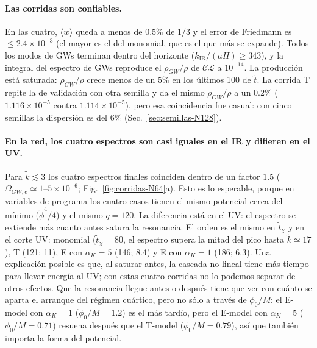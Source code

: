 \documentclass[11pt]{article}
\newcommand{\CosmoLattice}{\ensuremath{\mathcal{C}}\text{osmo}\ensuremath{\mathcal{L}}\text{attice}\xspace}
\begin{document}
            \paragraph{Las corridas son confiables.} En las cuatro, $\langle w\rangle$ queda a menos de $0.5\%$ de $1/3$ y el error de Friedmann es $\le 2.4 \times 10^{-3}$ (el mayor es el del monomial, que es el que más se expande). Todos los modos de GWs terminan dentro del horizonte ($k_{\text{IR}}/(aH) \ge 343$), y la integral del espectro de GWs reproduce el $\rho_{GW}/\rho$ de \CosmoLattice a $10^{-14}$. La producción está saturada: $\rho_{GW}/\rho$ crece menos de un $5\%$ en los últimos 100 de $\tilde t$. La corrida T repite la de validación con otra semilla y da el mismo $\rho_{GW}/\rho$ a un $0.2\%$ ($1.116 \times 10^{-5}$ contra $1.114 \times 10^{-5}$), pero esa coincidencia fue casual: con cinco semillas la dispersión es del $6\%$ (Sec.~\ref{sec:semillas-N128}).

            \paragraph{En la red, los cuatro espectros son casi iguales en el IR y difieren en el UV.} Para $\tilde k \lesssim 3$ los cuatro espectros finales coinciden dentro de un factor $1.5$ ($\Omega_{GW,e} \simeq 1$--$5 \times 10^{-6}$; Fig.~\ref{fig:corridas-N64}a). Esto es lo esperable, porque en variables de programa los cuatro casos tienen el mismo potencial cerca del mínimo ($\tilde\phi^4/4$) y el mismo $q = 120$. La diferencia está en el UV: el espectro se extiende más cuanto antes satura la resonancia. El orden es el mismo en $\tilde t_\chi$ y en el corte UV: monomial ($\tilde t_\chi = 80$, el espectro supera la mitad del pico hasta $\tilde k \simeq 17$), T (121; 11), E con $\alpha_K = 5$ (146; 8.4) y E con $\alpha_K = 1$ (186; 6.3). Una explicación posible es que, al saturar antes, la cascada no lineal tiene más tiempo para llevar energía al UV; con estas cuatro corridas no lo podemos separar de otros efectos. Que la resonancia llegue antes o después tiene que ver con cuánto se aparta el arranque del régimen cuártico, pero no sólo a través de $\phi_0/M$: el E-model con $\alpha_K = 1$ ($\phi_0/M = 1.2$) es el más tardío, pero el E-model con $\alpha_K = 5$ ($\phi_0/M = 0.71$) resuena después que el T-model ($\phi_0/M = 0.79$), así que también importa la forma del potencial.
\end{document}
